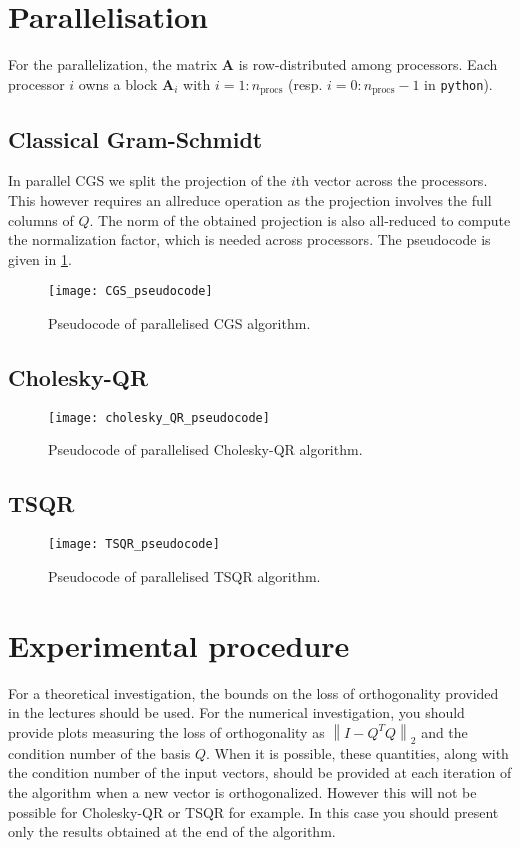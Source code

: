 \documentclass[a4paper, 12pt,oneside]{article}
\begin{document}
	\section{Parallelisation}
		For the parallelization, the matrix $\mathbf{A}$ is  row-distributed among processors. Each processor $i$ owns a block $\mathbf{A}_i$ with $i=1:n_{\text{procs}}$ (resp. $i=0:n_{\text{procs}}-1$ in \texttt{python}).

		\subsection{Classical Gram-Schmidt}
			In parallel CGS we split the projection of the $i$th vector across the processors. This however requires an allreduce operation as the projection involves the full columns of $Q$. The norm of the obtained projection is also all-reduced to compute the normalization factor, which is needed across processors. The pseudocode is given in \ref{fig:CGS-pseudocode}.   
			\begin{figure}[htb]       
				\centering             
					\vspace{0em}
					\texttt{[image: CGS\_pseudocode]}
					\caption{Pseudocode of parallelised CGS algorithm.}
					\label{fig:CGS-pseudocode}
			\end{figure}
		\subsection{Cholesky-QR}
			\begin{figure}
				\centering
				\texttt{[image: cholesky\_QR\_pseudocode]}
				\caption{Pseudocode of parallelised Cholesky-QR algorithm.}
				\label{fig:Cholesky-QR-pseudocode}
			\end{figure}
		\subsection{TSQR}
			\begin{figure}
				\centering
				\texttt{[image: TSQR\_pseudocode]}
				\caption{Pseudocode of parallelised TSQR algorithm.}
				\label{fig:TSQR-pseudocode}
			\end{figure}
	
	\section{Experimental procedure}
		For a theoretical investigation, the bounds on the loss of orthogonality provided in the lectures should be used. For the numerical investigation, you should provide plots measuring the loss of orthogonality as $\left\|I-Q^T Q\right\|_2$ and the condition number of the basis $Q$. When it is possible, these quantities, along with the condition number of the input vectors, should be provided at each iteration of the algorithm when a new vector is orthogonalized. However this will not be possible for Cholesky-QR or TSQR for example. In this case you should present only the results obtained at the end of the algorithm.
\end{document}
